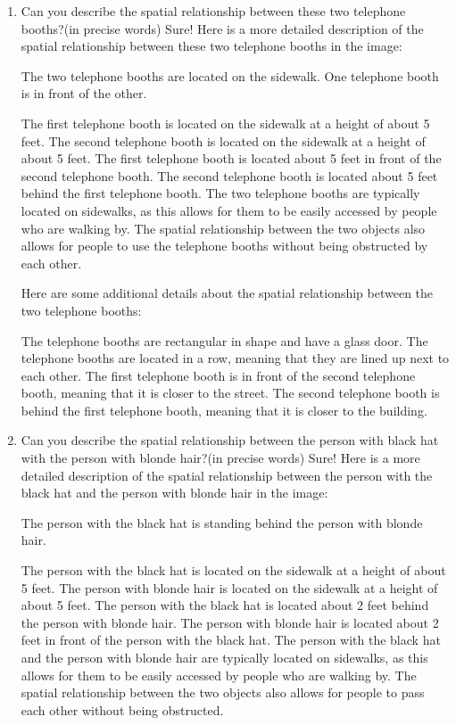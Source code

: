 \begin{enumerate}
    \item Can you describe the spatial relationship between these two telephone booths?(in precise words)
    \subitem 
    Sure! Here is a more detailed description of the spatial relationship between these two telephone booths in the image:
    
    The two telephone booths are located on the sidewalk. One telephone booth is in front of the other.
    
    The first telephone booth is located on the sidewalk at a height of about 5 feet.
    The second telephone booth is located on the sidewalk at a height of about 5 feet.
    The first telephone booth is located about 5 feet in front of the second telephone booth.
    The second telephone booth is located about 5 feet behind the first telephone booth.
    The two telephone booths are typically located on sidewalks, as this allows for them to be easily accessed by people who are walking by. The spatial relationship between the two objects also allows for people to use the telephone booths without being obstructed by each other.
    
    Here are some additional details about the spatial relationship between the two telephone booths:
    
    The telephone booths are rectangular in shape and have a glass door.
    The telephone booths are located in a row, meaning that they are lined up next to each other.
    The first telephone booth is in front of the second telephone booth, meaning that it is closer to the street.
    The second telephone booth is behind the first telephone booth, meaning that it is closer to the building.
    \item Can you describe the spatial relationship between the person with black hat with the person with blonde hair?(in precise words)
    \subitem 
    Sure! Here is a more detailed description of the spatial relationship between the person with the black hat and the person with blonde hair in the image:
    
    The person with the black hat is standing behind the person with blonde hair.
    
    The person with the black hat is located on the sidewalk at a height of about 5 feet.
    The person with blonde hair is located on the sidewalk at a height of about 5 feet.
    The person with the black hat is located about 2 feet behind the person with blonde hair.
    The person with blonde hair is located about 2 feet in front of the person with the black hat.
    The person with the black hat and the person with blonde hair are typically located on sidewalks, as this allows for them to be easily accessed by people who are walking by. The spatial relationship between the two objects also allows for people to pass each other without being obstructed.
    

\end{enumerate}
